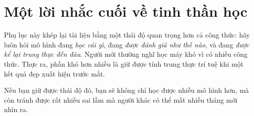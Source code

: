 \section{Một lời nhắc cuối về tinh thần học}

Phụ lục này khép lại tài liệu bằng một thái độ quan trọng hơn cả công thức: hãy luôn hỏi mô hình đang \emph{học cái gì}, đang \emph{được đánh giá như thế nào}, và đang \emph{được kể lại trung thực đến đâu}. Người mới thường nghĩ học máy khó vì có nhiều công thức. Thực ra, phần khó hơn nhiều là giữ được tính trung thực trí tuệ khi một kết quả đẹp xuất hiện trước mắt.

Nếu bạn giữ được thái độ đó, bạn sẽ không chỉ học được nhiều mô hình hơn, mà còn tránh được rất nhiều sai lầm mà người khác có thể mất nhiều tháng mới nhìn ra.
